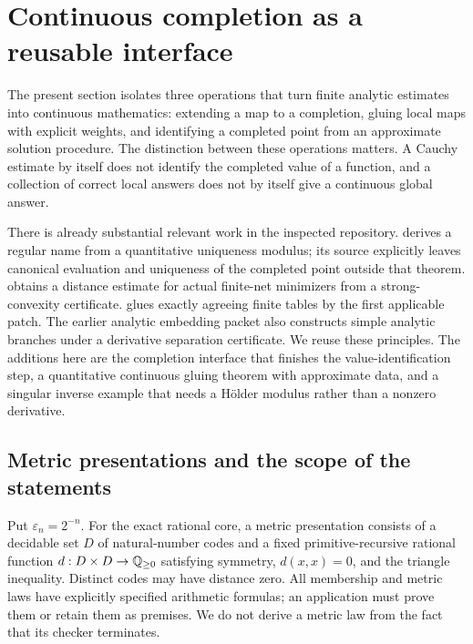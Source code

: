 \providecommand{\anE}{\varepsilon}
\providecommand{\anD}{\mathcal D}
\providecommand{\anH}{\widehat}

\section{Continuous completion as a reusable interface}
\label{sec:continuous-completion}

The present section isolates three operations that turn finite analytic
estimates into continuous mathematics: extending a map to a completion,
gluing local maps with explicit weights, and identifying a completed point
from an approximate solution procedure.  The distinction between these
operations matters.  A Cauchy estimate by itself does not identify the
completed value of a function, and a collection of correct local answers
does not by itself give a continuous global answer.

There is already substantial relevant work in the inspected repository.
 derives a regular name from a quantitative
uniqueness modulus; its source explicitly leaves canonical evaluation and
uniqueness of the completed point outside that theorem.
 obtains a distance estimate
for actual finite-net minimizers from a strong-convexity certificate.
 glues exactly agreeing finite tables by
the first applicable patch.  The earlier analytic embedding packet also
constructs simple analytic branches under a derivative separation
certificate.  We reuse these principles.  The additions here are the
completion interface that finishes the value-identification step, a
quantitative continuous gluing theorem with approximate data, and a
singular inverse example that needs a H\"older modulus rather than a
nonzero derivative.

\subsection{Metric presentations and the scope of the statements}

Put $\anE_n=2^{-n}$.  For the exact rational core, a metric presentation
consists of a decidable set $D$ of natural-number codes and a fixed
primitive-recursive rational function $d:D\times D\to\mathbb Q_{\ge0}$ satisfying
symmetry, $d(x,x)=0$, and the triangle inequality.  Distinct codes may have
distance zero.  All membership and metric laws have explicitly specified
arithmetic formulas; an application must prove them or retain them as
premises.  We do not derive a metric law from the fact that its checker
terminates.

